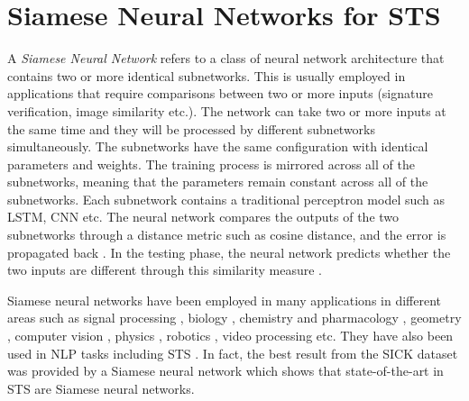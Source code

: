 \chapter{\label{cha:sts_siamese_neural_networks}Siamese Neural Networks for STS}

A \textit{Siamese Neural Network} refers to a class of neural network architecture that contains two or more identical subnetworks. This is usually employed in applications that require comparisons between two or more inputs (signature verification, image similarity etc.). The network can take two or more inputs at the same time and they will be processed by different subnetworks simultaneously. The subnetworks have the same configuration with identical parameters and weights. The training process is mirrored across all of the subnetworks, meaning that the parameters remain constant across all of the subnetworks. Each subnetwork contains a traditional perceptron model such as LSTM, CNN etc. The neural network compares the outputs of the two subnetworks through a distance metric such as cosine distance, and the error is propagated back \autocite{Mueller_Thyagarajan_2016}. In the testing phase, the neural network predicts whether the two inputs are different through this similarity measure \autocite{neculoiu-etal-2016-learning}. 

Siamese neural networks have been employed in many applications in different areas such as signal processing \autocite{thiolliere2015hybrid, 8461524, 8268960, 8453811, 10.1007/978-3-319-66429-3_11, 8064706, 8268994, Zeghidour2016}, biology \autocite{10.1093/bioinformatics/bty887, Szubert2019}, chemistry and pharmacology \autocite{10.1093/bioinformatics/btz411}, geometry \autocite{10.1093/jcde/qwaa003}, computer vision  \autocite{6797067,1467314,rs10020355,21be1428c6a44fb7a32d49ba83126bcb,6976727,6636646,Taigman_2014_CVPR,7163112,8269987,HANIF201954}, physics \autocite{Zou18, DEBAETS2019645}, robotics \autocite{Utkin2017, 7970671, 8461044}, video processing \autocite{AAAI1816790, 8036238, Liu2018, 8587153} etc. They have also been used in NLP tasks \autocite{10.5555/2018936.2018965,10.1145/3209978.3210144,Gonzalez2019} including STS \autocite{das-etal-2016-together, neculoiu-etal-2016-learning, Mueller_Thyagarajan_2016}. In fact, the best result from the SICK dataset \autocite{marelli-etal-2014-semeval} was provided by a Siamese neural network \autocite{Mueller_Thyagarajan_2016} which shows that state-of-the-art in STS are Siamese neural networks. 

